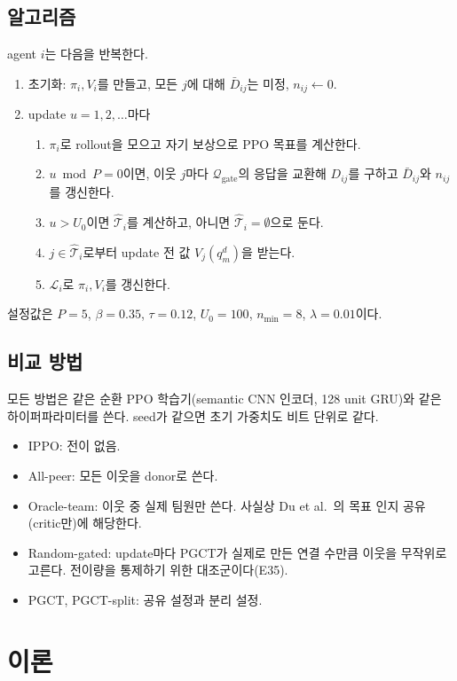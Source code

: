 \documentclass[11pt]{article}
\begin{document}
\subsection{알고리즘}
agent $i$는 다음을 반복한다.
\begin{enumerate}
  \item 초기화: $\pi_i, V_i$를 만들고, 모든 $j$에 대해 $\bar D_{ij}$는 미정, $n_{ij} \leftarrow 0$.
  \item update $u = 1, 2, \dots$마다
  \begin{enumerate}
    \item $\pi_i$로 rollout을 모으고 자기 보상으로 PPO 목표를 계산한다.
    \item $u \bmod P = 0$이면, 이웃 $j$마다 $\mathcal{Q}_{\mathrm{gate}}$의 응답을 교환해 $D_{ij}$를 구하고 $\bar D_{ij}$와 $n_{ij}$를 갱신한다.
    \item $u > U_0$이면 $\hat{\mathcal{T}}_i$를 계산하고, 아니면 $\hat{\mathcal{T}}_i = \emptyset$으로 둔다.
    \item $j \in \hat{\mathcal{T}}_i$로부터 update 전 값 $V_j(q^d_m)$을 받는다.
    \item $\mathcal{L}_i$로 $\pi_i, V_i$를 갱신한다.
  \end{enumerate}
\end{enumerate}
설정값은 $P = 5$, $\beta = 0.35$, $\tau = 0.12$, $U_0 = 100$, $n_{\min} = 8$, $\lambda = 0.01$이다.

\subsection{비교 방법}
모든 방법은 같은 순환 PPO 학습기(semantic CNN 인코더, 128 unit GRU)와 같은 하이퍼파라미터를 쓴다. seed가 같으면 초기 가중치도 비트 단위로 같다.
\begin{itemize}
  \item IPPO: 전이 없음.
  \item All-peer: 모든 이웃을 donor로 쓴다.
  \item Oracle-team: 이웃 중 실제 팀원만 쓴다. 사실상 Du et al.\ \cite{du2025}의 목표 인지 공유(critic만)에 해당한다.
  \item Random-gated: update마다 PGCT가 실제로 만든 연결 수만큼 이웃을 무작위로 고른다. 전이량을 통제하기 위한 대조군이다(E35).
  \item PGCT, PGCT-split: 공유 설정과 분리 설정.
\end{itemize}

\section{이론}
\end{document}
